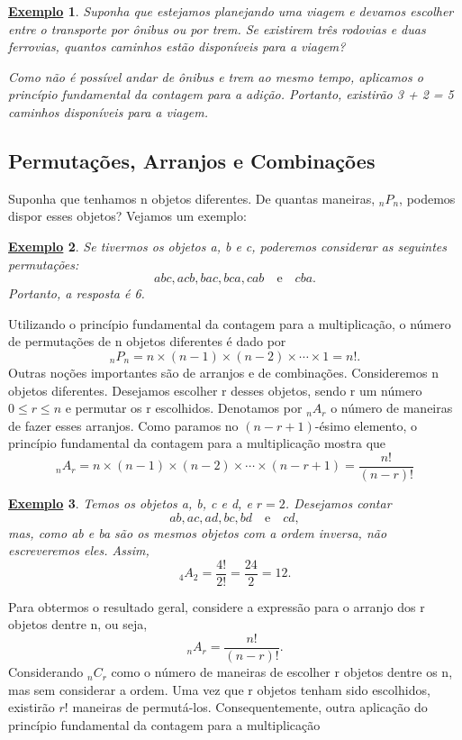 \documentclass{article}
\newtheorem{example}{\underline{Exemplo}}
\begin{document}
\begin{example}
  Suponha que estejamos planejando uma viagem e devamos escolher entre o transporte por ônibus ou por trem.
Se existirem três rodovias e duas ferrovias, quantos caminhos estão disponíveis para a viagem?

  Como não é possível andar de ônibus e trem ao mesmo tempo, aplicamos o princípio fundamental da contagem para a adição.
Portanto, existirão 3 + 2 = 5 caminhos disponíveis para a viagem.
\end{example}
\subsection{Permutações, Arranjos e Combinações}
  Suponha que tenhamos n objetos diferentes. De quantas maneiras, \(_{n}P_{n}\), podemos dispor esses objetos?
Vejamos um exemplo:
\begin{example}
  Se tivermos os objetos a, b e c, poderemos considerar as seguintes permutações: 
    \[
      abc, acb, bac, bca, cab\quad\text{e}\quad cba.
    \]
    Portanto, a resposta é 6.
\end{example}
  Utilizando o princípio fundamental da contagem para a multiplicação, o número de permutações
de n objetos diferentes é dado por 
  \[
    _{n}P_{n} = n\times(n-1)\times(n-2)\times \cdots\times 1 = n!.
  \]
  Outras noções importantes são de arranjos e de combinações. Consideremos n objetos diferentes. Desejamos 
escolher r desses objetos, sendo r um número \(0\leq r\leq n\) e permutar os r
escolhidos. Denotamos por \(_{n}A_{r}\) o número de maneiras de fazer esses arranjos.
Como paramos no \((n-r+1)\)-ésimo elemento, o princípio fundamental da contagem para a multiplicação mostra que 
  \[
    _{n}A_{r} = n\times(n-1)\times(n-2)\times \cdots\times(n-r+1) = \frac{n!}{(n-r)!}
  \]
 \begin{example}
   Temos os objetos a, b, c e d, e \(r=2\). Desejamos contar 
   \[
     ab, ac, ad, bc, bd\quad\text{e}\quad cd,
   \]
  mas, como ab e ba são os mesmos objetos com a ordem inversa, não escreveremos eles. Assim, 
  \[
    _{4}A_{2} = \frac{4!}{2!} = \frac{24}{2} = 12.
  \]
 \end{example}
  Para obtermos o resultado geral, considere a expressão para o arranjo dos r objetos dentre n, ou seja, 
  \[
    _{n}A_{r} = \frac{n!}{(n-r)!}.
  \]
  Considerando \(_{n}C_{r}\) como o número de maneiras de escolher r objetos dentre os n, mas 
sem considerar a ordem. Uma vez que r objetos tenham sido escolhidos, existirão \(r!\) maneiras
de permutá-los. Consequentemente, outra aplicação do princípio fundamental da contagem para a multiplicação 
\end{document}
